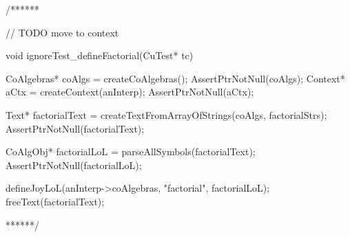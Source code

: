 \stopTestCase
\stopTestSuite


\starttyping
/******

// TODO move to context


void ignoreTest_defineFactorial(CuTest* tc) {
  CoAlgebras* coAlgs = createCoAlgebras();
  AssertPtrNotNull(coAlgs);
  Context* aCtx = createContext(anInterp);
  AssertPtrNotNull(aCtx);

  Text* factorialText = createTextFromArrayOfStrings(coAlgs, factorialStrs);
  AssertPtrNotNull(factorialText);

  CoAlgObj* factorialLoL = parseAllSymbols(factorialText);
  AssertPtrNotNull(factorialLoL);

  defineJoyLoL(anInterp->coAlgebras, "factorial", factorialLoL);
  freeText(factorialText);
}
******/
\stoptyping
